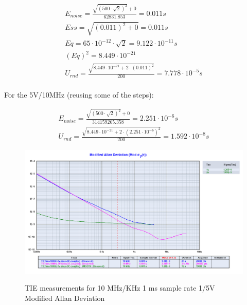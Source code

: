 \documentclass[11pt,english,a4paper]{article}
\begin{document}
\begingroup
\addtolength{\jot}{1em}
\begin{align}
E_{noise} = \frac{\sqrt{(500\cdot\sqrt{2})^2} + 0}{62831.853} = 0.011s\\
Ess = \sqrt{ (0.011)^2 + 0 } = 0.011s \\
Eq = 65\cdot10^{-12}\cdot\sqrt{2} = 9.122\cdot10^{-11}s \\
(Eq)^2 = 8.449\cdot10^{-21} \\
U_{rnd} = \frac{\sqrt{8.449\cdot10^{-21} + 2\cdot(0.011)^2}}{200} = 7.778\cdot10^{-5}s \\
\end{align}
\endgroup

For the 5V/10MHz (reusing some of the steps):

\begingroup
\addtolength{\jot}{1em}
\begin{align}
E_{noise} = \frac{\sqrt{(500\cdot\sqrt{2})^2} + 0}{314159265.358} = 2.251\cdot10^{-6}s\\
U_{rnd} = \frac{\sqrt{8.449\cdot10^{-21} + 2\cdot(2.251\cdot10^{-6})^2}}{200} = 1.592\cdot10^{-8}s
\end{align}
\endgroup


\begin{figure}[!htb]
  \centering
    \includegraphics[width=1\textwidth]{mod_allan_last_part3.png}
    \label{fig:15Vsg_10x_mod_allan_dev}
      \caption{TIE measurements for 10 MHz/KHz 1 ms sample rate 1/5V Modified Allan Deviation}
\end{figure}
\end{document}
